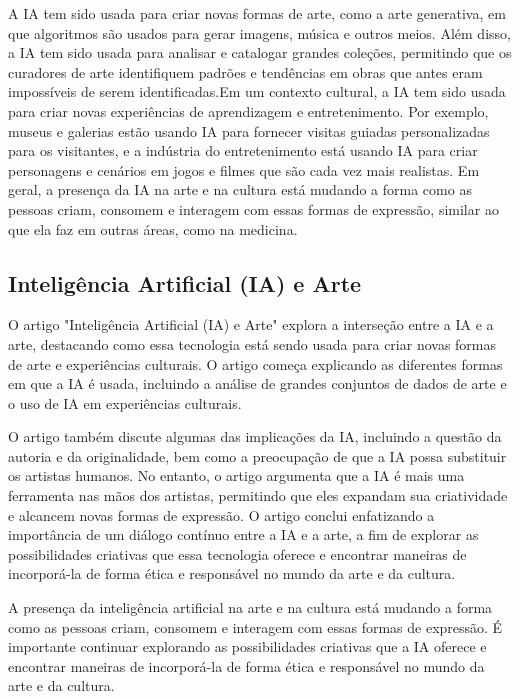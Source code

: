 \documentclass[12pt]{article}
\begin{document}
    A IA tem sido usada para criar novas formas de arte, como a arte generativa, em que algoritmos são usados para gerar imagens, música e outros meios. Além disso, a IA tem sido usada para analisar e catalogar grandes coleções, permitindo que os curadores de arte identifiquem padrões e tendências em obras que antes eram impossíveis de serem identificadas.Em um contexto cultural, a IA tem sido usada para criar novas experiências de aprendizagem e entretenimento. Por exemplo, museus e galerias estão usando IA para fornecer visitas guiadas personalizadas para os visitantes, e a indústria do entretenimento está usando IA para criar personagens e cenários em jogos e filmes que são cada vez mais realistas. Em geral, a presença da IA na arte e na cultura está mudando a forma como as pessoas criam, consomem e interagem com essas formas de expressão, similar ao que ela faz em outras áreas, como na medicina.


    \subsection{Inteligência Artificial (IA) e Arte}
	\label{sec:trab_relacionados}

    O artigo "Inteligência Artificial (IA) e Arte" explora a interseção entre a IA e a arte, destacando como essa tecnologia está sendo usada para criar novas formas de arte e experiências culturais. O artigo começa explicando as diferentes formas em que a IA é usada, incluindo a análise de grandes conjuntos de dados de arte e o uso de IA em experiências culturais.
    
    O artigo também discute algumas das implicações da IA, incluindo a questão da autoria e da originalidade, bem como a preocupação de que a IA possa substituir os artistas humanos. No entanto, o artigo argumenta que a IA é mais uma ferramenta nas mãos dos artistas, permitindo que eles expandam sua criatividade e alcancem novas formas de expressão. O artigo conclui enfatizando a importância de um diálogo contínuo entre a IA e a arte, a fim de explorar as possibilidades criativas que essa tecnologia oferece e encontrar maneiras de incorporá-la de forma ética e responsável no mundo da arte e da cultura.
    
    A presença da inteligência artificial na arte e na cultura está mudando a forma como as pessoas criam, consomem e interagem com essas formas de expressão. É importante continuar explorando as possibilidades criativas que a IA oferece e encontrar maneiras de incorporá-la de forma ética e responsável no mundo da arte e da cultura.
\end{document}
